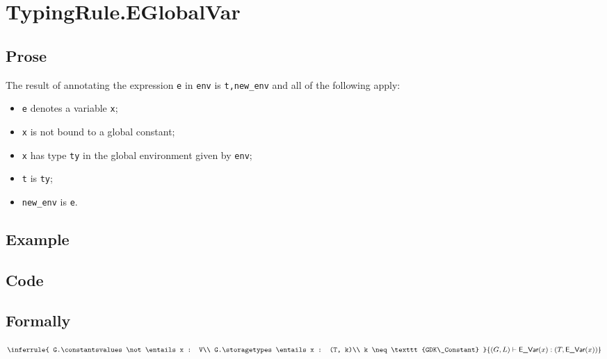 \documentclass{book}
\begin{document}
\section{TypingRule.EGlobalVar \label{sec:TypingRule.EGlobalVar}}

  \subsection{Prose}
  The result of annotating the expression \texttt{e} in \texttt{env} is
\texttt{t,new\_env} and all of the following apply:
  \begin{itemize}
  \item \texttt{e} denotes a variable \texttt{x};
  \item \texttt{x} is not bound to a global constant;
  \item \texttt{x} has type \texttt{ty} in the global environment given by \texttt{env};
  \item \texttt{t} is \texttt{ty};
  \item \texttt{new\_env} is \texttt{e}.
  \end{itemize}

  \subsection{Example}

  \subsection{Code}

\begin{emptyformal}
  \subsection{Formally}
  
\[
\inferrule{
  G.\constantsvalues \not\entails x : V\\
  G.\storagetypes \entails x : (T, k)\\
  k \neq \texttt{GDK\_Constant}
  }
{(G,L) \entails \evar(x) : (T, \evar(x))}
\]

\end{emptyformal}
\end{document}
